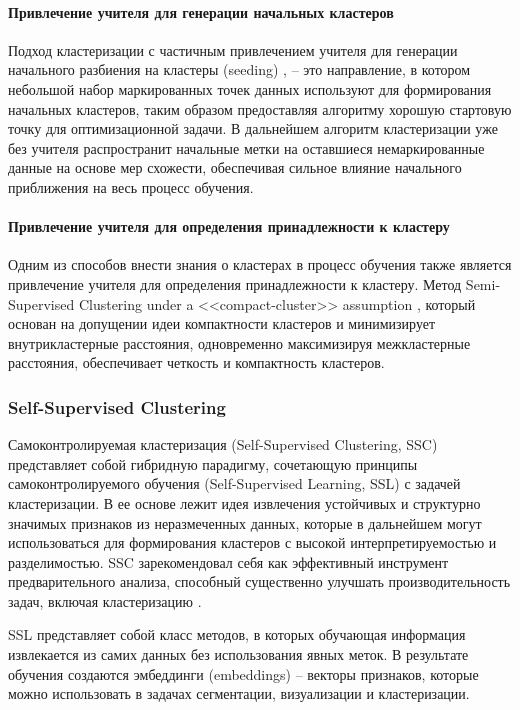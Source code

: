         \paragraph{Привлечение учителя для генерации начальных кластеров}
            Подход кластеризации с частичным привлечением учителя для генерации начального разбиения на кластеры (seeding) \cite{basu2002seeding}, \cite{antoine2014seeding} -- это направление, в котором небольшой набор маркированных точек данных используют для формирования начальных кластеров, таким образом предоставляя алгоритму хорошую стартовую точку для оптимизационной задачи. В дальнейшем алгоритм кластеризации уже без учителя распространит начальные метки на оставшиеся немаркированные данные на основе мер схожести, обеспечивая сильное влияние начального приближения на весь процесс обучения.

        \paragraph{Привлечение учителя для определения принадлежности к кластеру}
            Одним из способов внести знания о кластерах в процесс обучения также является привлечение учителя для определения принадлежности к кластеру. Метод Semi-Supervised Clustering under a <<compact-cluster>> assumption \cite{jiang2023compactcluster}, который основан на допущении идеи компактности кластеров и минимизирует внутрикластерные расстояния, одновременно максимизируя межкластерные расстояния, обеспечивает четкость и компактность кластеров.

    \subsubsection{Self-Supervised Clustering}
        Самоконтролируемая кластеризация (Self-Supervised Clustering, SSC) представляет собой гибридную парадигму, сочетающую принципы самоконтролируемого обучения (Self-Supervised Learning, SSL) с задачей кластеризации. В ее основе лежит идея извлечения устойчивых и структурно значимых признаков из неразмеченных данных, которые в дальнейшем могут использоваться для формирования кластеров с высокой интерпретируемостью и разделимостью. SSC зарекомендовал себя как эффективный инструмент предварительного анализа, способный существенно улучшать производительность задач, включая кластеризацию \cite{Gui2023SSL}.

        SSL представляет собой класс методов, в которых обучающая информация извлекается из самих данных без использования явных меток. В результате обучения создаются эмбеддинги (embeddings) -- векторы признаков, которые можно использовать в задачах сегментации, визуализации и кластеризации.

